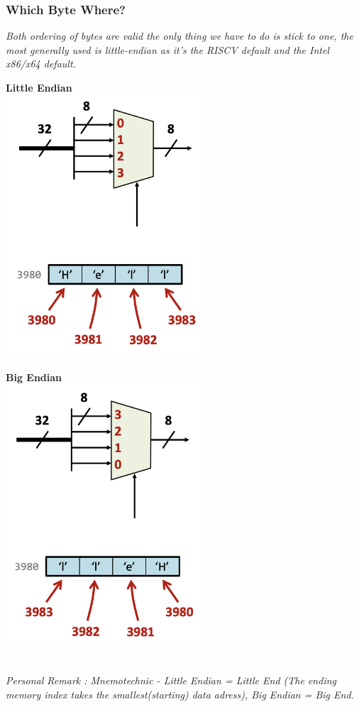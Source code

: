 \subsubsection{Which Byte Where?}
\textit{Both ordering of bytes are valid the only thing we have to do is stick to one, the most generally used is little-endian as it's the RISCV default and the Intel x86/x64 default.} \\ \vspace*{5px}
\begin{minipage}[htp]{0.45\textwidth}
    \begin{center}
        \textbf{Little Endian} \\ \vspace*{5px}
        \includegraphics[width=0.55\textwidth]{chapters/chapter1c/images/bytes.png}
    \end{center}   
\end{minipage}
\hfill
\vline
\hfill
\begin{minipage}[htp]{0.45\textwidth}
    \begin{center}
        \textbf{Big Endian} \\ \vspace*{5px}
        \includegraphics[width=0.55\textwidth]{chapters/chapter1c/images/bytes2.png}
\end{center}
\end{minipage} \\ \vspace*{5px}
\textit{Personal Remark : Mnemotechnic - Little Endian = Little End (The ending memory index takes the smallest(starting) data adress), Big Endian = Big End.}
